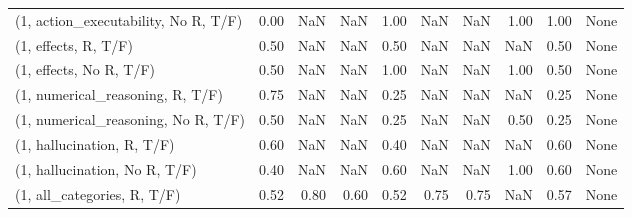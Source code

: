 \begin{table*}[h!]
\begin{adjustbox}{width=2\columnwidth,center}
\begin{tabular}{lrrr|rrr|rrr}
(1, action\_executability, No R, T/F) &                      0.00 &                   NaN &                       NaN &                          1.00 &                       NaN &                           NaN &                                   1.00 &                               1.00 &                                  None \\
(1, effects, R, T/F)                 &                      0.50 &                   NaN &                       NaN &                          0.50 &                       NaN &                           NaN &                                    NaN &                               0.50 &                                  None \\
(1, effects, No R, T/F)              &                      0.50 &                   NaN &                       NaN &                          1.00 &                       NaN &                           NaN &                                   1.00 &                               0.50 &                                  None \\
(1, numerical\_reasoning, R, T/F)     &                      0.75 &                   NaN &                       NaN &                          0.25 &                       NaN &                           NaN &                                    NaN &                               0.25 &                                  None \\
(1, numerical\_reasoning, No R, T/F)  &                      0.50 &                   NaN &                       NaN &                          0.25 &                       NaN &                           NaN &                                   0.50 &                               0.25 &                                  None \\
(1, hallucination, R, T/F)           &                      0.60 &                   NaN &                       NaN &                          0.40 &                       NaN &                           NaN &                                    NaN &                               0.60 &                                  None \\
(1, hallucination, No R, T/F)        &                      0.40 &                   NaN &                       NaN &                          0.60 &                       NaN &                           NaN &                                   1.00 &                               0.60 &                                  None \\
(1, all\_categories, R, T/F)          &                      0.52 &                  0.80 &                      0.60 &                          0.52 &                      0.75 &                          0.75 &                                    NaN &                               0.57 &                                  None \\

\end{tabular}
\end{adjustbox}
\end{table*}
